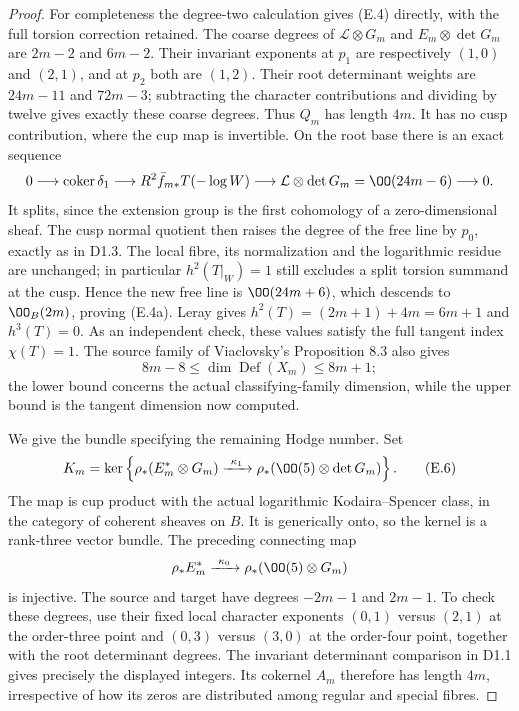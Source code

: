 \begin{proof}
For completeness the degree-two calculation gives (E.4) directly,
with the full torsion correction retained. The coarse degrees of
$\mathcal L\otimes G_m$ and $E_m\otimes\det G_m$ are $2m-2$
and $6m-2$. Their invariant exponents at $p_1$ are respectively
$(1,0)$ and $(2,1)$, and at $p_2$ both are $(1,2)$.
Their root determinant weights are $24m-11$ and $72m-3$;
subtracting the character contributions and dividing by twelve
gives exactly these coarse degrees. Thus $Q_m$ has length $4m$.
It has no cusp contribution, where the cup map is invertible.
On the root base there is an exact sequence
\[
 0\longrightarrow\operatorname{coker}\delta_1
 \longrightarrow R^2\bar f_{m*}T(-\log W)
 \longrightarrow\mathcal L\otimes\det G_m
                 =\OO(24m-6)\longrightarrow0.
\]
It splits, since the extension group is the first cohomology of a
zero-dimensional sheaf. The cusp normal quotient then raises the
degree of the free line by $p_0$, exactly as in D1.3. The local
fibre, its normalization and the logarithmic residue are unchanged;
in particular $h^2(T|_W)=1$ still excludes a split torsion summand at
the cusp. Hence the new free line is $\OO(24m+6)$, which descends to
$\OO_B(2m)$, proving (E.4a). Leray gives
$h^2(T)=(2m+1)+4m=6m+1$ and $h^3(T)=0$.
As an independent check, these values satisfy the full tangent
index $\chi(T)=1$. The source family of Viaclovsky's Proposition 8.3
also gives
\[
 8m-8\le\dim\operatorname{Def}(X_m)\le8m+1;
\]
the lower bound concerns the actual classifying-family dimension,
while the upper bound is the tangent dimension now computed.

We give the bundle specifying the remaining Hodge number. Set
\[
 K_m=\ker\left\{\rho_*(E_m^*\otimes G_m)
  \xrightarrow{\ \kappa_1\ }
       \rho_*(\OO(5)\otimes\det G_m)\right\}.         \tag{E.6}
\]
The map is cup product with the actual logarithmic
Kodaira--Spencer class, in the category of coherent sheaves on $B$.
It is generically onto, so the kernel is a rank-three vector bundle.
The preceding connecting map
\[
 \rho_*E_m^*\xrightarrow{\ \kappa_0\ }
                 \rho_*(\OO(5)\otimes G_m)
\]
is injective. The source and target have degrees $-2m-1$ and
$2m-1$. To check these degrees, use their fixed local character
exponents $(0,1)$ versus $(2,1)$ at the order-three point and
$(0,3)$ versus $(3,0)$ at the order-four point, together with the
root determinant degrees. The invariant determinant comparison in
D1.1 gives precisely the displayed integers. Its cokernel $A_m$
therefore has length $4m$, irrespective of how its zeros are
distributed among regular and special fibres.


\end{proof}
